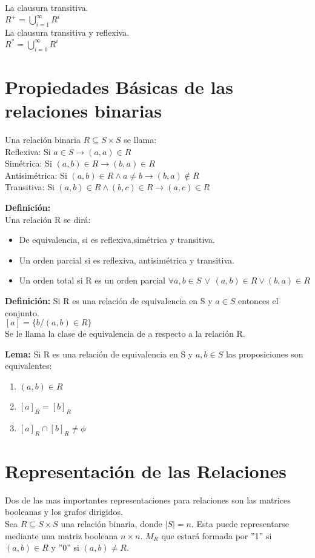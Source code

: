 La clausura transitiva.\\
$R^+=\bigcup_{i=1}^\infty R^i$\\

La clausura transitiva y reflexiva. \\

$R^*= \bigcup_{i=0}^\infty R^i$

\section{Propiedades Básicas de las relaciones binarias}
Una relación binaria $R\subseteq S\times S$ se llama:\\
Reflexiva: Si $a\in S \rightarrow (a,a)\in R$\\
Simétrica: Si $(a,b)\in R\rightarrow(b,a)\in R$\\
Antisimétrica: Si $(a,b)\in R\land a\not=b \rightarrow(b,a)\not\in R$\\
Transitiva: Si $(a,b)\in R \land (b,c)\in R \rightarrow(a,c)\in R$

\textbf{Definición: } \\
Una relación R se dirá:
\begin{itemize}
\item De equivalencia, si es reflexiva,simétrica y transitiva.
\item Un orden parcial si es reflexiva, antisimétrica y transitiva.
\item Un orden total si R es un orden parcial $\forall a,b \in S \, \lor \, (a,b)\in R \lor (b,a)\in R$
\end{itemize}

\textbf{Definición: }Si R es una relación de equivalencia en S y $a\in S$ entonces el conjunto.\\
$[a]=\lbrace b/(a,b)\in R\rbrace$\\
Se le llama la clase de equivalencia de a respecto a la relación R.

\textbf{Lema: }Si R es una relación de equivalencia en S y $a,b\in S$ las proposiciones son equivalentes:
\begin{enumerate}
\item $(a,b)\in R$
\item $[a]_R=[b]_R$
\item $[a]_R \cap [b]_R \not= \phi$
\end{enumerate}

\section{Representación de las Relaciones}
Dos de las mas importantes representaciones para relaciones son las matrices booleanas y los grafos dirigidos.\\
Sea $R\subseteq S\times S$ una relación binaria, donde $|S|=n$. Esta puede representarse mediante una matriz booleana $n \times n$. $M_R$ que estará formada por ''1'' si $(a,b)\in R$ y ''0'' si $(a,b)\not=R$.\\

